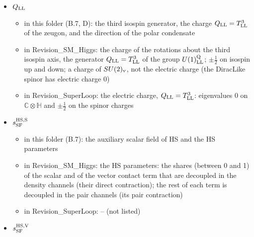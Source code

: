 \documentclass[
  10pt,
]{article}
\providecommand{\tightlist}{%
  \setlength{\itemsep}{0pt}\setlength{\parskip}{0pt}}
\begin{document}
\begin{itemize}
  \begin{itemize}
  \tightlist
  \item
    in this folder (A.7, B.7, D): the brochon (eight components: Dirac
    index and isospin index) and its mass
  \item
    in Revision\_SM\_Higgs: the spinor field, the doublet field: an
    isospin doublet of four-component Dirac fields, eight complex
    Grassmann (anticommuting) operator components \(\Psi_{{\rm LL},c}\),
    made of two spinor charges of the super-loop. Under the hypotheses
    of this folder \(SU(2)_{\rm v}\) is \(SU(2)_L\) and the field has
    the hypercharge \(Y^{\rm SM}=1/4\) and the electric charges \(3/4\)
    (isospin up) and \(-1/4\) (isospin down); under the earlier
    hypotheses, which the inherited documents still state, it was the
    DiracLike spinor with the electric charge 0
  \item
    in Revision\_SuperLoop: the Dirac isodoublet of the spinor charges:
    a field of 8 complex Grassmann components (Dirac \(\otimes\)
    isospin), whose \(\gamma^{\rm ch}_{\rm LL}=+1\) half is built from
    \(\mathfrak s_{\rm LL}\) and whose other half from the
    complex-conjugate super-loop
  \end{itemize}
\item
  \(Q_{\rm LL}\)

  \begin{itemize}
  \tightlist
  \item
    in this folder (B.7, D): the third isospin generator, the charge
    \(Q_{\rm LL}=T^3_{\rm LL}\) of the zeugon, and the direction of the
    polar condensate
  \item
    in Revision\_SM\_Higgs: the charge of the rotations about the third
    isospin axis, the generator \(Q_{\rm LL}=T^3_{\rm LL}\) of the group
    \(U(1)^{\rm Q}_{\rm LL}\); \(\pm\tfrac12\) on isospin up and down; a
    charge of \(SU(2)_{\rm v}\), not the electric charge (the DiracLike
    spinor has electric charge 0)
  \item
    in Revision\_SuperLoop: the electric charge,
    \(Q_{\rm LL}=T^3_{\rm LL}\): eigenvalues \(0\) on
    \(\mathbb C\otimes\mathbb H\) and \(\pm\tfrac12\) on the spinor
    charges
  \end{itemize}
\item
  \(s^{\rm HS,S}_{\rm SF}\)

  \begin{itemize}
  \tightlist
  \item
    in this folder (B.7): the auxiliary scalar field of HS and the HS
    parameters
  \item
    in Revision\_SM\_Higgs: the HS parameters: the shares (between 0 and
    1) of the scalar and of the vector contact term that are decoupled
    in the density channels (their direct contraction); the rest of each
    term is decoupled in the pair channels (its pair contraction)
  \item
    in Revision\_SuperLoop: -- (not listed)
  \end{itemize}
\item
  \(s^{\rm HS,V}_{\rm SF}\)


\end{itemize}
\end{document}
